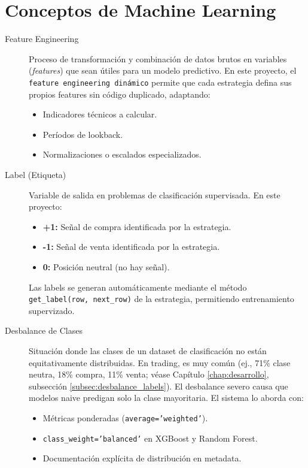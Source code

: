 
\section*{Conceptos de Machine Learning}

\begin{description}
    \item[Feature Engineering] Proceso de transformación y combinación de datos brutos en variables (\textit{features}) que sean útiles para un modelo predictivo. En este proyecto, el \texttt{feature engineering dinámico} permite que cada estrategia defina sus propios features sin código duplicado, adaptando:
    \begin{itemize}
        \item Indicadores técnicos a calcular.
        \item Períodos de lookback.
        \item Normalizaciones o escalados especializados.
    \end{itemize}

    \item[Label (Etiqueta)] Variable de salida en problemas de clasificación supervisada. En este proyecto:
    \begin{itemize}
        \item \textbf{+1:} Señal de compra identificada por la estrategia.
        \item \textbf{-1:} Señal de venta identificada por la estrategia.
        \item \textbf{0:} Posición neutral (no hay señal).
    \end{itemize}
    Las labels se generan automáticamente mediante el método \texttt{get\_label(row, next\_row)} de la estrategia, permitiendo entrenamiento supervizado.

    \item[Desbalance de Clases] Situación donde las clases de un dataset de clasificación no están equitativamente distribuidas. En trading, es muy común (ej., 71\% clase neutra, 18\% compra, 11\% venta; véase Capítulo \ref{chap:desarrollo}, subsección \ref{subsec:desbalance_labels}). El desbalance severo causa que modelos naive predigan solo la clase mayoritaria. El sistema lo aborda con:
    \begin{itemize}
        \item Métricas ponderadas (\texttt{average='weighted'}).
        \item \texttt{class\_weight='balanced'} en XGBoost y Random Forest.
        \item Documentación explícita de distribución en metadata.
    \end{itemize}


\end{description}
